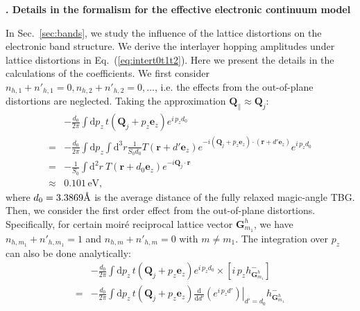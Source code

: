 \documentclass[aps,prx,10pt,twocolumn,superscriptaddress]{revtex4}
\def\V{{\uppercase\expandafter{\romannumeral 5}}}
\def\angstrom{\mbox{\normalfont\AA}}
\def\angstrom{\mbox{\normalfont\AA}}
\begin{document}
\begin{widetext}
\vspace{12pt}
\begin{center}
\textbf{\large \V.  Details in the formalism for the effective electronic continuum model}
\end{center}


In Sec.~\ref{sec:bands}, we study the influence of the lattice distortions on the electronic band structure. We derive the interlayer hopping amplitudes under lattice distortions in Eq.~(\ref{eq:intert0t1t2}). Here we present the details in the calculations of the coefficients. We first consider $n_{h,1}+n'_{h,1}=0, n_{h,2}+n'_{h,2}=0, \dots$, i.e. the effects from the out-of-plane distortions are neglected. Taking the approximation $\textbf{Q}_{\parallel}\approx\textbf{Q}_{j}$:
\begin{equation}
\begin{split}
&-\frac{d_{0}}{2\pi}\int\mathrm{d}p_{z}\,t(\textbf{Q}_{j}+p_{z}\textbf{e}_{z})e^{i\,p_{z}d_{0}}\\
=&-\frac{d_{0}}{2\pi}\int\mathrm{d}p_{z}\int\mathrm{d}^{3}r\frac{1}{S_{0}d_{0}} T(\textbf{r}+d'\textbf{e}_{z})e^{-i(\textbf{Q}_{j}+p_{z}\textbf{e}_{z})\cdot(\textbf{r}+d'\textbf{e}_{z})}e^{i\,p_{z}d_{0}}\\
=&-\frac{1}{S_{0}}\int\mathrm{d}^{2}r\ T(\textbf{r}+d_{0}\textbf{e}_{z})e^{-i\textbf{Q}_{j}\cdot\textbf{r}}\\
\approx &0.101\,\textrm{eV},
\end{split}
\end{equation}
where $d_{0}=3.3869\angstrom$ is the average distance of the fully relaxed magic-angle TBG. Then, we consider the first order effect from the out-of-plane distortions. Specifically, for certain moir\'e reciprocal lattice vector $\textbf{G}^{h}_{m_{1}}$, we have $n_{h,m_{1}}+n'_{h,m_{1}}\!=\!1$ and $n_{h,m}+n'_{h,m}\!=\!0$ with $m\!\neq\!m_{1}$. The integration over $p_z$ can also be done analytically:
\begin{equation}
\begin{split}
&-\frac{d_{0}}{2\pi}\int\mathrm{d}p_{z}\,t(\textbf{Q}_{j}+p_{z}\textbf{e}_{z})e^{i\,p_{z}d_{0}}\times\left[i\,p_{z}h^{-}_{\textbf{G}^{h}_{m_{1}}}\right]\\
=&-\frac{d_{0}}{2\pi}\int\mathrm{d}p_{z}\,t(\textbf{Q}_{j}+p_{z}\textbf{e}_{z})\left.\frac{\mathrm{d}}{\mathrm{d}d'}\left(e^{i\,p_{z}d'}\right)\right|_{d'=d_{0}}h^{-}_{\textbf{G}^{h}_{m_{1}}}\\

\end{split}
\end{equation}
\end{widetext}
\end{document}
